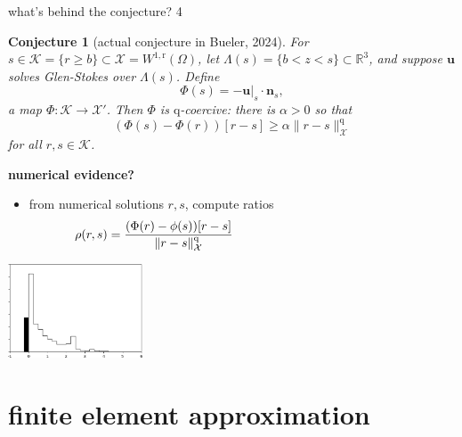\documentclass[10pt,dvipsnames]{beamer}
\theoremstyle{theorem}
\newtheorem*{conjecture}{Conjecture}
\newcommand{\bn}{\mathbf{n}}
\newcommand{\bu}{\mathbf{u}}
\newcommand{\cK}{\mathcal{K}}
\newcommand{\cX}{\mathcal{X}}
\newcommand{\RR}{\mathbb{R}}
\newcommand{\qq}{\mathrm{q}}
\newcommand{\rr}{\mathrm{r}}
\begin{document}
\begin{frame}{what's behind the conjecture? 4}

\bigskip
\begin{conjecture}[actual conjecture in Bueler, 2024]
For $s \in \cK = \{r \ge b\} \subset \cX = W^{1,\rr}(\Omega)$, let $\Lambda(s) = \{b<z<s\} \subset \RR^3$, and suppose $\bu$ solves Glen-Stokes over $\Lambda(s)$.  Define
	$$\Phi(s) = - \bu|_s \cdot \bn_s,$$
a map $\Phi:\cK \to \cX'$.  Then $\Phi$ is $\qq$-coercive: there is $\alpha>0$ so that
	$$\left(\Phi(s) - \Phi(r)\right)[r-s] \ge \alpha \|r-s\|_\cX^\qq$$
for all $r,s\in\cK$.
\end{conjecture}

\bigskip
\footnotesize
\noindent \textbf{numerical evidence?}

\begin{itemize}
\item from numerical solutions $r,s$, compute ratios
    $$\rho(r,s) = \frac{(\Phi(r)-\phi(s))[r-s]}{\|r-s\|_\cX^\qq} \hspace{50mm}$$
\end{itemize}

\vspace{-20mm}
\hfill \includegraphics[width=0.3\textwidth]{smoothratios} \qquad
\end{frame}


\section{finite element approximation}
\end{document}
